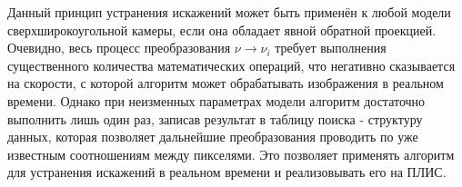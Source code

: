 Данный принцип устранения искажений может быть применён к любой модели сверхширокоугольной камеры, если
она обладает явной обратной проекцией. Очевидно, весь процесс преобразования $\nu \rightarrow \nu_i$ требует 
выполнения существенного количества математических операций, что негативно сказывается на скорости, с 
которой алгоритм может обрабатывать изображения в реальном времени. Однако при неизменных параметрах 
модели алгоритм достаточно выполнить лишь один раз, записав результат в таблицу поиска - структуру данных, 
которая позволяет дальнейшие преобразования проводить по уже известным соотношениям между пикселями. Это 
позволяет применять алгоритм для устранения искажений в реальном времени и реализовывать его на ПЛИС.

\vspace{\baselineskip}








